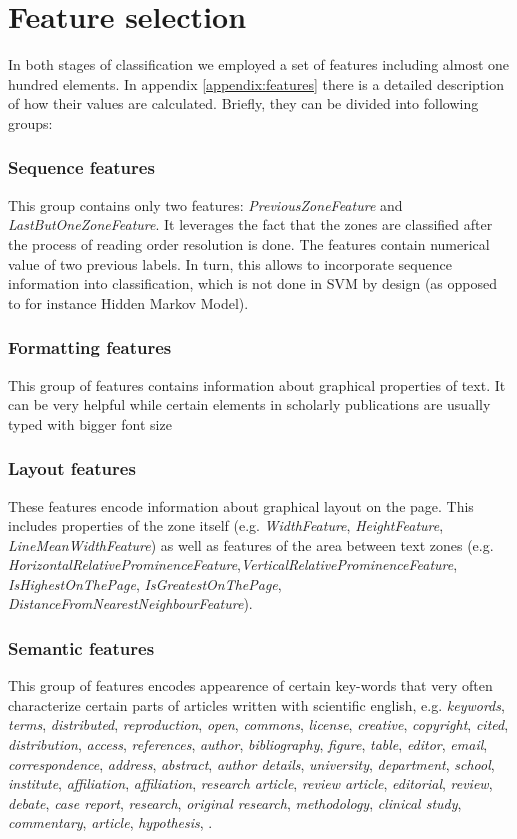 \section{Feature selection}
In both stages of classification we employed a set of features including almost one hundred elements. In appendix \ref{appendix:features} there is a detailed description of how their values are calculated. Briefly, they can be divided into following groups:
\subsubsection{Sequence features}
This group contains only two features: \textit{PreviousZoneFeature} and \textit{LastButOneZoneFeature}. It leverages the fact that the zones are classified after the process of reading order resolution is done. The features contain numerical value of two previous labels. In turn, this allows to incorporate sequence information into classification, which is not done in SVM by design (as opposed to for instance Hidden Markov Model).
\subsubsection{Formatting features}
This group of features contains information about graphical properties of text. It can be very helpful while certain elements in scholarly publications are usually typed with bigger font size
\subsubsection{Layout features}
These features encode information about graphical layout on the page. This includes properties of the zone itself (e.g. \textit{WidthFeature}, \textit{HeightFeature}, \textit{LineMeanWidthFeature}) as well as features of the area between text zones (e.g. \textit{HorizontalRelativeProminenceFeature},\textit{VerticalRelativeProminenceFeature}, \textit{IsHighestOnThePage}, \textit{IsGreatestOnThePage}, \textit{DistanceFromNearestNeighbourFeature}). 
\subsubsection{Semantic features}
This group of features encodes appearence of certain key-words that very often characterize certain parts of articles written with scientific english, e.g. \textit{keywords}, \textit{terms}, \textit{distributed}, \textit{reproduction}, \textit{open}, \textit{commons}, \textit{license}, \textit{creative}, \textit{copyright}, \textit{cited}, \textit{distribution}, \textit{access}, \textit{references}, \textit{author}, \textit{bibliography}, \textit{figure}, \textit{table}, \textit{editor}, \textit{email}, \textit{correspondence}, \textit{address}, \textit{abstract}, \textit{author details}, \textit{university}, \textit{department}, \textit{school}, \textit{institute}, \textit{affiliation}, \textit{affiliation}, \textit{research article}, \textit{review article}, \textit{editorial}, \textit{review}, \textit{debate}, \textit{case report}, \textit{research}, \textit{original research}, \textit{methodology}, \textit{clinical study}, \textit{commentary}, \textit{article}, 
 \textit{hypothesis}, .
